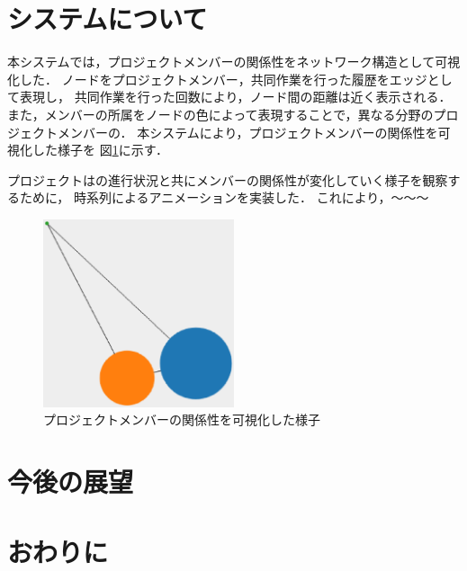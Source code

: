 \documentclass[submit,techrep]{ipsj}
\begin{document}
\section{システムについて}


本システムでは，プロジェクトメンバーの関係性をネットワーク構造として可視化した．
ノードをプロジェクトメンバー，共同作業を行った履歴をエッジとして表現し，
共同作業を行った回数により，ノード間の距離は近く表示される．
また，メンバーの所属をノードの色によって表現することで，異なる分野のプロジェクトメンバーの．
本システムにより，プロジェクトメンバーの関係性を可視化した様子を
図\ref{cop-map-graph}に示す．

プロジェクトはの進行状況と共にメンバーの関係性が変化していく様子を観察するために，
時系列によるアニメーションを実装した．
これにより，〜〜〜

\begin{figure}[h]
  \centering
  \includegraphics[width=0.5\textwidth]{img/cop-map-graph.eps}
  \caption{プロジェクトメンバーの関係性を可視化した様子}
  \label{cop-map-graph}
\end{figure}

\section{今後の展望}

\section{おわりに}
\end{document}
